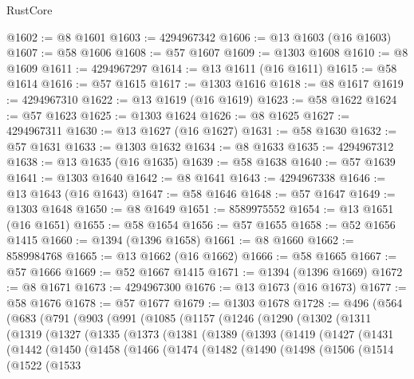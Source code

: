 \begin{lexlean}{RustCore}
\begin{coremodule}
@1602 := @8 @1601
@1603 := 4294967342
@1606 := @13 @1603 (@16 @1603)
@1607 := @58 @1606
@1608 := @57 @1607
@1609 := @1303 @1608
@1610 := @8 @1609
@1611 := 4294967297
@1614 := @13 @1611 (@16 @1611)
@1615 := @58 @1614
@1616 := @57 @1615
@1617 := @1303 @1616
@1618 := @8 @1617
@1619 := 4294967310
@1622 := @13 @1619 (@16 @1619)
@1623 := @58 @1622
@1624 := @57 @1623
@1625 := @1303 @1624
@1626 := @8 @1625
@1627 := 4294967311
@1630 := @13 @1627 (@16 @1627)
@1631 := @58 @1630
@1632 := @57 @1631
@1633 := @1303 @1632
@1634 := @8 @1633
@1635 := 4294967312
@1638 := @13 @1635 (@16 @1635)
@1639 := @58 @1638
@1640 := @57 @1639
@1641 := @1303 @1640
@1642 := @8 @1641
@1643 := 4294967338
@1646 := @13 @1643 (@16 @1643)
@1647 := @58 @1646
@1648 := @57 @1647
@1649 := @1303 @1648
@1650 := @8 @1649
@1651 := 8589975552
@1654 := @13 @1651 (@16 @1651)
@1655 := @58 @1654
@1656 := @57 @1655
@1658 := @52 @1656 @1415
@1660 := @1394 (@1396 @1658)
@1661 := @8 @1660
@1662 := 8589984768
@1665 := @13 @1662 (@16 @1662)
@1666 := @58 @1665
@1667 := @57 @1666
@1669 := @52 @1667 @1415
@1671 := @1394 (@1396 @1669)
@1672 := @8 @1671
@1673 := 4294967300
@1676 := @13 @1673 (@16 @1673)
@1677 := @58 @1676
@1678 := @57 @1677
@1679 := @1303 @1678
@1728 := @496
    (@564
      (@683
        (@791
          (@903
            (@991
              (@1085
                (@1157
                  (@1246
                    (@1290
                      (@1302
                        (@1311
                          (@1319
                            (@1327
                              (@1335
                                (@1373
                                  (@1381
                                    (@1389
                                      (@1393
                                        (@1419
                                          (@1427
                                            (@1431
                                              (@1442
                                                (@1450
                                                  (@1458
                                                    (@1466
                                                      (@1474
                                                        (@1482
                                                          (@1490
                                                            (@1498
                                                              (@1506
                                                                (@1514
                                                                  (@1522
                                                                    (@1533

\end{coremodule}
\end{lexlean}
